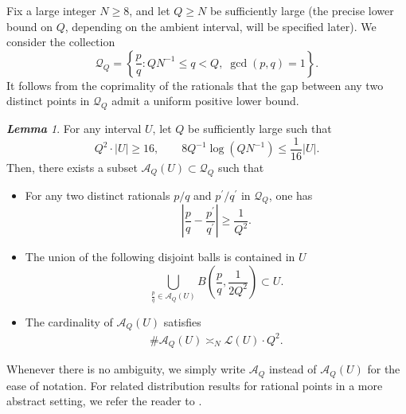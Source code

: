 \documentclass[11pt]{amsart}
\numberwithin{equation}{section}
\newcommand{\0}{\mathbf{0}}
\theoremstyle{remark}
\newtheorem{lem}{\bf Lemma}[section]
\begin{document}
Fix a large integer \(N\ge 8\), and let
\(Q\ge N\) be sufficiently large (the precise lower bound on \(Q\),
depending on the ambient interval, will be specified later). We consider
the collection
\[
\mathcal Q_Q
=
\left\{
\frac pq:
QN^{-1}\le q<Q,\;
\gcd(p,q)=1
\right\}.
\]
It follows from the coprimality of the rationals that the gap between any two distinct points in $\mathcal{Q}_{Q}$ admit a uniform positive lower bound.
\begin{lem}\label{WDP}For any interval $U$, let $Q$ be sufficiently large such that
        \begin{equation}\label{f1}
        Q^2\cdot|U|\ge 16,\qquad
       {8Q^{-1}\log (QN^{-1})}\le \frac{1}{16}|U|.
        \end{equation} Then, there exists a subset $\mathcal{A}_{Q}(U)\subset \mathcal{Q}_{Q}$ such that
\begin{itemize}
  \item For any two distinct rationals $p/q$ and $p^{\prime}/q^{\prime}$ in $\mathcal{Q}_Q$, one has
   $$\left|\frac{p}{q}-\frac{p^{\prime}}{q^{\prime}}\right|\ge \frac{1}{Q^2}.$$
     \item The union of the following disjoint balls is  contained in $U$
        $$\bigcup_{\frac{p}{q}\in \mathcal{A}_{Q}(U)}B\left(\frac{p}{q},\frac{1}{2Q^2}\right)\subset U.$$
    \item The cardinality of \(\mathcal A_Q(U)\) satisfies
        \begin{align}\label{number}
        \# \mathcal{A}_{Q}(U)\asymp_{N} \mathcal{L}(U)\cdot Q^{2}.
        \end{align}
\end{itemize}
\end{lem}
Whenever there is no ambiguity, we simply write $\mathcal{A}_{Q}$ instead of $\mathcal{A}_{Q}(U)$ for the ease of notation. For related distribution results for rational points in a more abstract
setting, we refer the reader to
\cite[Definition~1.3]{BandiGhoshNandi}.
\end{document}
